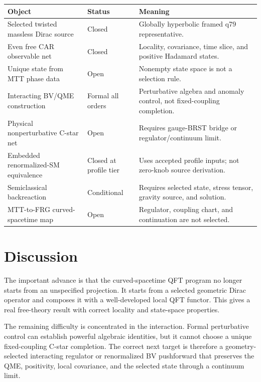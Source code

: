 \documentclass[11pt]{article}
\theoremstyle{definition}
\theoremstyle{remark}
\begin{document}
\begin{center}
\begin{tabularx}{\textwidth}{@{}
>{\raggedright\arraybackslash}p{}
>{\raggedright\arraybackslash}p{}
>{\raggedright\arraybackslash}X@{}}
\toprule
Object & Status & Meaning\\
\midrule
Selected twisted massless Dirac source & Closed &
Globally hyperbolic framed q79 representative.\\
Even free CAR observable net & Closed &
Locality, covariance, time slice, and positive Hadamard states.\\
Unique state from MTT phase data & Open &
Nonempty state space is not a selection rule.\\
Interacting BV/QME construction & Formal all orders &
Perturbative algebra and anomaly control, not fixed-coupling completion.\\
Physical nonperturbative C-star net & Open &
Requires gauge-BRST bridge or regulator/continuum limit.\\
Embedded renormalized-SM equivalence & Closed at profile tier &
Uses accepted profile inputs; not zero-knob source derivation.\\
Semiclassical backreaction & Conditional &
Requires selected state, stress tensor, gravity source, and solution.\\
MTT-to-FRG curved-spacetime map & Open &
Regulator, coupling chart, and continuation are not selected.\\
\bottomrule
\end{tabularx}
\end{center}

\section{Discussion}

The important advance is that the curved-spacetime QFT program no longer
starts from an unspecified projection. It starts from a selected geometric
Dirac operator and composes it with a well-developed local QFT functor. This
gives a real free-theory result with correct locality and state-space
properties.

The remaining difficulty is concentrated in the interaction. Formal
perturbative control can establish powerful algebraic identities, but it
cannot choose a unique fixed-coupling C-star completion. The correct next
target is therefore a geometry-selected interacting regulator or
renormalized BV pushforward that preserves the QME, positivity, local
covariance, and the selected state through a continuum limit.
\end{document}
